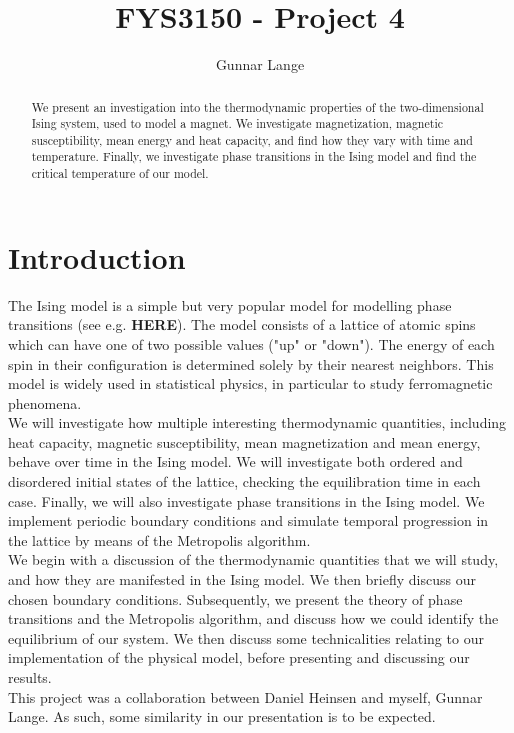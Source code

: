 \documentclass[a4paper, 10pt]{article}
\title{FYS3150 - Project 4}
\author{Gunnar Lange}
\begin{document}
\maketitle
\begin{abstract}
We present an investigation into the thermodynamic properties of the two-dimensional Ising system, used to model a magnet. We investigate magnetization, magnetic susceptibility, mean energy and heat capacity, and find how they vary with time and temperature. Finally, we investigate phase transitions in the Ising model and find the critical temperature of our model.
\end{abstract}
\tableofcontents
\section{Introduction}
The Ising model is a simple but very popular model for modelling phase transitions (see e.g. \textbf{HERE}). The model consists of a lattice of atomic spins which can have one of two possible values ("up" or "down"). The energy of each spin in their configuration is determined solely by their nearest neighbors. This model is widely used in statistical physics, in particular to study ferromagnetic phenomena.\\
\linebreak
We will investigate how multiple interesting thermodynamic quantities, including heat capacity, magnetic susceptibility, mean magnetization and mean energy, behave over time in the Ising model. We will investigate both ordered and disordered initial states of the lattice, checking the equilibration time in each case. Finally, we will also investigate phase transitions in the Ising model. We implement periodic boundary conditions and simulate temporal progression in the lattice by means of the Metropolis algorithm.\\
\linebreak
We begin with a discussion of the thermodynamic quantities that we will study, and how they are manifested in the Ising model. We then briefly discuss our chosen boundary conditions. Subsequently, we present the theory of phase transitions and the Metropolis algorithm, and discuss how we could identify the equilibrium of our system. We then discuss some technicalities relating to our implementation of the physical model, before presenting and discussing our results.\\
\linebreak
This project was a collaboration between Daniel Heinsen and myself, Gunnar Lange. As such, some similarity in our presentation is to be expected.
\end{document}
